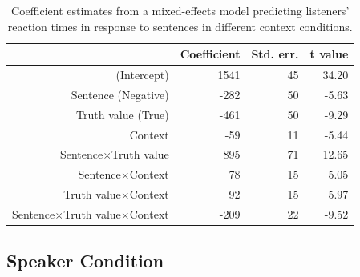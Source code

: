 \documentclass[man]{apa2}
\begin{document}
\begin{table}[t]
\caption{Coefficient estimates from a mixed-effects model predicting listeners' reaction times in response to sentences in different context conditions.}
\begin{center}
\small\addtolength{\tabcolsep}{-5pt}
\begin{tabular}{rrrr}
  \hline
 & Coefficient & Std. err. & t value \\ 
  \hline
(Intercept) & 1541 & 45 & 34.20 \\ 
  Sentence (Negative) & -282 & 50 & -5.63  \\ 
  Truth value (True) & -461 & 50 & -9.29 \\
  Context & -59 & 11 & -5.44 \\ 
  Sentence$\times$Truth value & 895 & 71 & 12.65 \\
  Sentence$\times$Context & 78 & 15 & 5.05 \\
  Truth value$\times$Context & 92 & 15 & 5.97 \\
  Sentence$\times$Truth value$\times$Context & -209 & 22 & -9.52 \\
   \hline
\end{tabular}
\vspace{-1.5cm}
\end{center}
\end{table}

\subsection{Speaker Condition}
\end{document}
